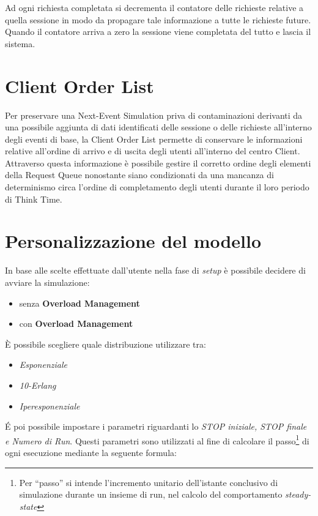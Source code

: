 Ad ogni richiesta completata si decrementa il contatore delle richieste relative a quella sessione in modo da propagare tale informazione a tutte le richieste future. Quando il contatore arriva a zero la sessione viene completata del tutto e lascia il sistema.

\section{Client Order List}
Per preservare una Next-Event Simulation priva di contaminazioni derivanti da una possibile aggiunta di dati identificati delle sessione o delle richieste all'interno degli eventi di base, la Client Order List permette di conservare le informazioni relative all'ordine di arrivo e di uscita  degli utenti all'interno del centro Client. Attraverso questa informazione è possibile gestire il corretto ordine degli elementi della Request Queue nonostante siano condizionati da una mancanza di determinismo circa l'ordine di completamento degli utenti durante il loro periodo di Think Time.


\section{Personalizzazione del modello}
In base alle scelte effettuate dall'utente nella fase di \textit{setup} è possibile decidere di avviare la simulazione:
\begin{itemize}
\item senza \textbf{Overload Management}
\item con \textbf{Overload Management}
\end{itemize}
 
\noindent È possibile scegliere quale distribuzione utilizzare tra:
\begin{itemize}
\item \textit{Esponenziale}
\item \textit{10-Erlang}
\item \textit{Iperesponenziale}
\end{itemize}

\noindent \'E poi possibile impostare i parametri riguardanti lo \textit{STOP iniziale, STOP finale e Numero di Run}. Questi parametri sono utilizzati al fine di calcolare il passo\footnote{Per ``passo'' si intende l'incremento unitario dell'istante conclusivo di simulazione durante un insieme di run, nel calcolo del comportamento \textit{steady-state}} di ogni esecuzione mediante la seguente formula:


